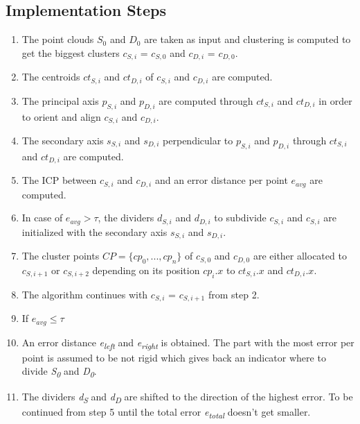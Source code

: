 \documentclass[a4paper,english,11pt]{report}
\begin{document}
\subsection{Implementation Steps}

\begin{enumerate}
	\item The point clouds $S_0$ and $D_0$ are taken as input and clustering is computed to get the biggest clusters $c_{S, i}$ = $c_{S, 0}$ and $c_{D, i}$ = $c_{D, 0}$.
	
	\item The centroids $ct_{S, i}$ and $ct_{D, i}$ of $c_{S, i}$ and $c_{D, i}$ are computed.
	
	\item The principal axis $p_{S, i}$ and $p_{D, i}$ are computed through $ct_{S, i}$ and $ct_{D, i}$ in order to orient and align $c_{S, i}$ and $c_{D, i}$.
	
	\item The secondary axis $s_{S, i}$ and $s_{D, i}$ perpendicular to $p_{S, i}$ and $p_{D, i}$ through $ct_{S, i}$ and $ct_{D, i}$ are computed.
	
	\item The ICP between $c_{S, i}$ and $c_{D, i}$ and an error distance per point $e_{avg}$ are computed. 
	
	\item In case of $e_{avg} > \tau$, the dividers $d_{S, i}$ and $d_{D, i}$ to subdivide $c_{S, i}$ and $c_{S, i}$ are initialized with the secondary axis $s_{S, i}$ and $s_{D, i}$.
	
	\item The cluster points $ CP =  \{ {cp_0, ..., cp_n}\}$ of $c_{S, 0}$ and $c_{D, 0}$  are either allocated to $c_{S, i + 1}$ or $c_{S, i + 2}$ depending on its position $cp_i.x$ to $ct_{S, i}.x$ and $ct_{D, i}.x$. 
	
	\item The algorithm continues with $c_{S, i}$ = $c_{S, i + 1}$ from step 2.
	
	\item If $e_{avg} \le \tau$
	
	\item An error distance \textit{e\textsubscript{left}} and \textit{e\textsubscript{right}} is obtained. The part with the most error per point is assumed to be not rigid which gives back an indicator where to divide \textit{S\textsubscript{0}} and \textit{D\textsubscript{0}}.
	
	\item The dividers \textit{d\textsubscript{S}} and \textit{d\textsubscript{D}} are shifted to the direction of the highest error. To be continued from step 5 until the total error \textit{e\textsubscript{total}} doesn't get smaller.
\end{enumerate}
\end{document}

